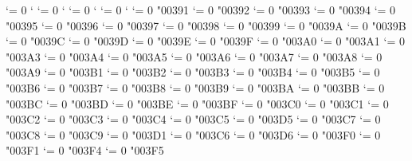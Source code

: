 {  \Umathcode `\w = 0 \unimathfam `\w
  \Umathcode `\x = 0 \unimathfam `\x
  \Umathcode `\y = 0 \unimathfam `\y
  \Umathcode `\z = 0 \unimathfam `\z
  \Umathcode `\Α = 0 \unimathfam "00391
  \Umathcode `\Β = 0 \unimathfam "00392
  \Umathcode `\Γ = 0 \unimathfam "00393
  \Umathcode `\Δ = 0 \unimathfam "00394
  \Umathcode `\Ε = 0 \unimathfam "00395
  \Umathcode `\Ζ = 0 \unimathfam "00396
  \Umathcode `\Η = 0 \unimathfam "00397
  \Umathcode `\Θ = 0 \unimathfam "00398
  \Umathcode `\Ι = 0 \unimathfam "00399
  \Umathcode `\Κ = 0 \unimathfam "0039A
  \Umathcode `\Λ = 0 \unimathfam "0039B
  \Umathcode `\Μ = 0 \unimathfam "0039C
  \Umathcode `\Ν = 0 \unimathfam "0039D
  \Umathcode `\Ξ = 0 \unimathfam "0039E
  \Umathcode `\Ο = 0 \unimathfam "0039F
  \Umathcode `\Π = 0 \unimathfam "003A0
  \Umathcode `\Ρ = 0 \unimathfam "003A1
  \Umathcode `\Σ = 0 \unimathfam "003A3
  \Umathcode `\Τ = 0 \unimathfam "003A4
  \Umathcode `\Υ = 0 \unimathfam "003A5
  \Umathcode `\Φ = 0 \unimathfam "003A6
  \Umathcode `\Χ = 0 \unimathfam "003A7
  \Umathcode `\Ψ = 0 \unimathfam "003A8
  \Umathcode `\Ω = 0 \unimathfam "003A9
  \Umathcode `\α = 0 \unimathfam "003B1
  \Umathcode `\β = 0 \unimathfam "003B2
  \Umathcode `\γ = 0 \unimathfam "003B3
  \Umathcode `\δ = 0 \unimathfam "003B4
  \Umathcode `\ε = 0 \unimathfam "003B5
  \Umathcode `\ζ = 0 \unimathfam "003B6
  \Umathcode `\η = 0 \unimathfam "003B7
  \Umathcode `\θ = 0 \unimathfam "003B8
  \Umathcode `\ι = 0 \unimathfam "003B9
  \Umathcode `\κ = 0 \unimathfam "003BA
  \Umathcode `\λ = 0 \unimathfam "003BB
  \Umathcode `\μ = 0 \unimathfam "003BC
  \Umathcode `\ν = 0 \unimathfam "003BD
  \Umathcode `\ξ = 0 \unimathfam "003BE
  \Umathcode `\ο = 0 \unimathfam "003BF
  \Umathcode `\π = 0 \unimathfam "003C0
  \Umathcode `\ρ = 0 \unimathfam "003C1
  \Umathcode `\ς = 0 \unimathfam "003C2
  \Umathcode `\σ = 0 \unimathfam "003C3
  \Umathcode `\τ = 0 \unimathfam "003C4
  \Umathcode `\υ = 0 \unimathfam "003C5
  \Umathcode `\φ = 0 \unimathfam "003D5
  \Umathcode `\χ = 0 \unimathfam "003C7
  \Umathcode `\ψ = 0 \unimathfam "003C8
  \Umathcode `\ω = 0 \unimathfam "003C9
  \Umathcode `\ϑ = 0 \unimathfam "003D1
  \Umathcode `\ϕ = 0 \unimathfam "003C6
  \Umathcode `\ϖ = 0 \unimathfam "003D6
  \Umathcode `\ϰ = 0 \unimathfam "003F0
  \Umathcode `\ϱ = 0 \unimathfam "003F1
  \Umathcode `\ϴ = 0 \unimathfam "003F4
  \Umathcode `\ϵ = 0 \unimathfam "003F5
\fi
\tenrm}

